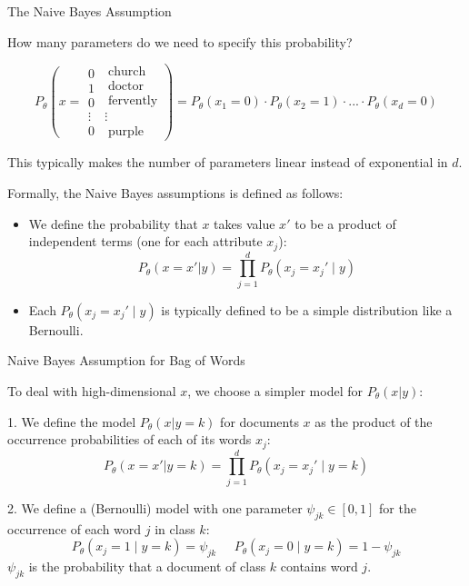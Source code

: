 \documentclass[../../main.tex]{subfiles}
\begin{document}
\begin{frame}[fragile]{The Naive Bayes Assumption }


How many parameters do we need to specify this probability?

$$
 P_{\theta} \left( x=
\begin{array}{c}
0 \\
1 \\
0 \\
\vdots \\
0 
\end{array}
\right.
\left.
\begin{array}{l}
\;\text{church} \\
\;\text{doctor} \\
\;\text{fervently} \\
\vdots \\
\;\text{purple}
\end{array}
\right) = P_\theta(x_1=0) \cdot P_\theta(x_2=1) \cdot ... \cdot P_\theta(x_d=0)
$$

This typically makes the number of parameters linear instead of exponential in $d$.

\vspace{0.2cm}

Formally, the Naive Bayes assumptions is defined as follows:

 \begin{itemize}
     \item We define the probability that $x$ takes value $x'$ to be a product of independent terms (one for each attribute $x_j$): $$ P_\theta(x=x'|y) = \prod_{j=1}^d P_\theta(x_j = x_j' \mid y) $$
     \item Each $P_\theta(x_j = x_j' \mid y)$ is typically defined to be a simple distribution like a Bernoulli.
 \end{itemize}


\end{frame}

\begin{frame}[fragile]{Naive Bayes Assumption for Bag of Words}

To deal with high-dimensional $x$, we choose a simpler model for $P_\theta(x|y)$:
\vspace{0.2cm}

1. We define the model $P_\theta(x|y=k)$ for documents $x$ as the product of the occurrence probabilities of each of its words $x_j$:
    $$ P_\theta(x = x'|y=k) = \prod_{j=1}^d P_\theta(x_j = x_j' \mid y=k) $$

2. We define a (Bernoulli) model with one parameter $\psi_{jk} \in [0,1]$ for the occurrence of each word $j$ in class $k$:
    $$P_\theta(x_j = 1 \mid y=k) = \psi_{jk} \;\;\;\;\; P_\theta(x_j = 0 \mid y=k) = 1-\psi_{jk}$$
    $\psi_{jk}$ is the probability that a document of class $k$ contains word $j$.



\end{frame}
\end{document}
